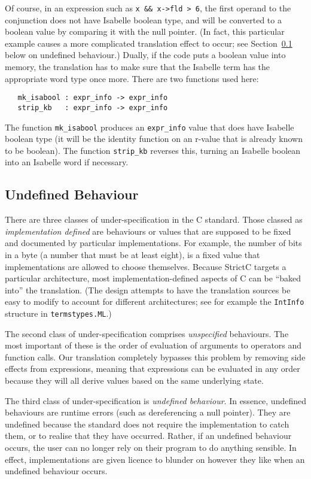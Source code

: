\documentclass{article}
\newcommand{\strictc}{\textsf{StrictC}}
\newcommand{\MLsuffix}{.ML}
\newcommand{\srcfile}[1]{\texttt{#1}}
\newcommand{\MLfile}[1]{\srcfile{#1\MLsuffix}}
\begin{document}
Of course, in an expression such as \verb|x && x->fld > 6|, the first
operand to the conjunction does not have Isabelle boolean type, and
will be converted to a boolean value by comparing it with the null
pointer.  (In fact, this particular example causes a more complicated
translation effect to occur; see Section~\ref{sec:undefined-behaviour}
below on undefined behaviour.)  Dually, if the code puts a boolean
value into memory, the translation has to make sure that the Isabelle
term has the appropriate word type once more.  There are two functions
used here:
\begin{verbatim}
   mk_isabool : expr_info -> expr_info
   strip_kb   : expr_info -> expr_info
\end{verbatim}
The function \texttt{mk_isabool} produces an \texttt{expr_info} value
that does have Isabelle boolean type (it will be the identity function
on an r-value that is already known to be boolean).  The function
\texttt{strip_kb} reverses this, turning an Isabelle boolean into an
Isabelle word if necessary.

\subsection{Undefined Behaviour}
\label{sec:undefined-behaviour}

There are three classes of under-specification in the C standard.
Those classed as \emph{implementation defined} are behaviours or
values that are supposed to be fixed and documented by particular
implementations.  For example, the number of bits in a byte (a number
that must be at least eight), is a fixed value that implementations
are allowed to choose themselves.  Because \strictc{} targets a
particular architecture, most implementation-defined aspects of C can
be ``baked into'' the translation.  (The design attempts to have the
translation sources be easy to modify to account for different
architectures; see for example the \texttt{IntInfo} structure in
\MLfile{termstypes}.)

The second class of under-specification comprises \emph{unspecified}
behaviours.  The most important of these is the order of evaluation of
arguments to operators and function calls.  Our translation completely
bypasses this problem by removing side effects from expressions,
meaning that expressions can be evaluated in any order because they
will all derive values based on the same underlying state.

The third class of under-specification is \emph{undefined behaviour}.
In essence, undefined behaviours are runtime errors (such as
dereferencing a null pointer).  They are undefined because the
standard does not require the implementation to catch them, or to
realise that they have occurred.  Rather, if an undefined behaviour
occurs, the user can no longer rely on their program to do anything
sensible.  In effect, implementations are given licence to blunder on
however they like when an undefined behaviour occurs.
\end{document}
